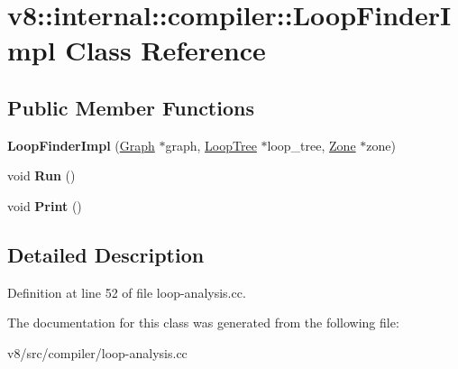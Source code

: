 \hypertarget{classv8_1_1internal_1_1compiler_1_1LoopFinderImpl}{}\section{v8\+:\+:internal\+:\+:compiler\+:\+:Loop\+Finder\+Impl Class Reference}
\label{classv8_1_1internal_1_1compiler_1_1LoopFinderImpl}
\subsection*{Public Member Functions}
\begin{DoxyCompactItemize}
\item 
\mbox{\label{classv8_1_1internal_1_1compiler_1_1LoopFinderImpl_a874f05d8bc1c1489d0956a828cd5db94}} 
{\bfseries Loop\+Finder\+Impl} (\mbox{\hyperlink{classv8_1_1internal_1_1compiler_1_1Graph}{Graph}} $\ast$graph, \mbox{\hyperlink{classv8_1_1internal_1_1compiler_1_1LoopTree}{Loop\+Tree}} $\ast$loop\+\_\+tree, \mbox{\hyperlink{classv8_1_1internal_1_1Zone}{Zone}} $\ast$zone)
\item 
\mbox{\label{classv8_1_1internal_1_1compiler_1_1LoopFinderImpl_a8983753185f157e93228eca1545b8c40}} 
void {\bfseries Run} ()
\item 
\mbox{\label{classv8_1_1internal_1_1compiler_1_1LoopFinderImpl_aeb32fc4188f9d6b719fd180ea1350ce3}} 
void {\bfseries Print} ()
\end{DoxyCompactItemize}


\subsection{Detailed Description}


Definition at line 52 of file loop-\/analysis.\+cc.



The documentation for this class was generated from the following file\+:\begin{DoxyCompactItemize}
\item 
v8/src/compiler/loop-\/analysis.\+cc\end{DoxyCompactItemize}
